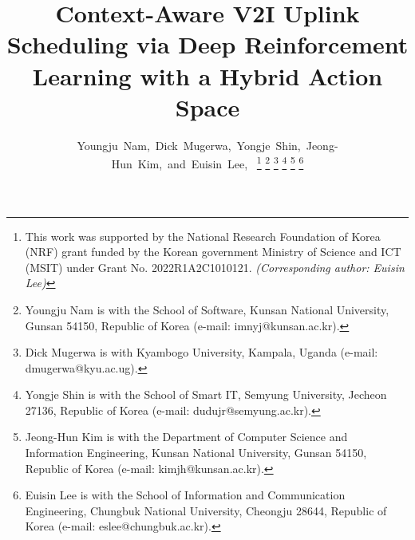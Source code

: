 \documentclass[journal]{IEEEtran}
\begin{document}
%
%
%
\title{Context-Aware V2I Uplink Scheduling via Deep Reinforcement Learning with a Hybrid Action Space}

\author{Youngju~Nam,~Dick~Mugerwa,~Yongje~Shin,~Jeong-Hun~Kim,~and~Euisin~Lee,~\IEEEmembership{}%
\thanks{This work was supported by the National Research Foundation of Korea (NRF) grant funded by the Korean government Ministry of Science and ICT (MSIT) under Grant No. 2022R1A2C1010121.
\textit{(Corresponding author: Euisin Lee)}}%
\thanks{Youngju Nam is with the School of Software, Kunsan National University, Gunsan 54150, Republic of Korea (e-mail: imnyj@kunsan.ac.kr).}%
\thanks{Dick Mugerwa is with Kyambogo University, Kampala, Uganda (e-mail: dmugerwa@kyu.ac.ug).}%
\thanks{Yongje Shin is with the School of Smart IT, Semyung University, Jecheon 27136, Republic of Korea (e-mail: dudujr@semyung.ac.kr).}%
\thanks{Jeong-Hun Kim is with the Department of Computer Science and Information Engineering, Kunsan National University, Gunsan 54150, Republic of Korea (e-mail: kimjh@kunsan.ac.kr).}%
\thanks{Euisin Lee is with the School of Information and Communication Engineering, Chungbuk National University, Cheongju 28644, Republic of Korea (e-mail: eslee@chungbuk.ac.kr).}%
}
\end{document}
